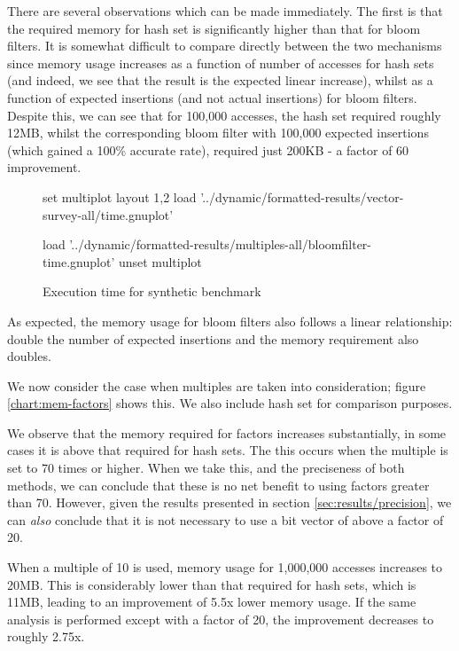 There are several observations which can be made immediately. The first is that the required memory for hash set is significantly higher than that for bloom filters. It is somewhat difficult to compare directly between the two mechanisms since memory usage increases as a function of number of accesses for hash sets (and indeed, we see that the result is the expected linear increase), whilst as a function of expected insertions (and not actual insertions) for bloom filters. Despite this, we can see that for 100,000 accesses, the hash set required roughly 12MB, whilst the corresponding bloom filter with 100,000 expected insertions (which gained a 100\% accurate rate), required just 200KB - a factor of 60 improvement.

\begin{figure}
	\centering
	\begin{gnuplot}[terminal=pdf]
	set multiplot layout 1,2
		load '../dynamic/formatted-results/vector-survey-all/time.gnuplot'
		
		load '../dynamic/formatted-results/multiples-all/bloomfilter-time.gnuplot'
	unset multiplot
	\end{gnuplot}
	\caption{Execution time for synthetic benchmark}
	\label{chart:time-all}
\end{figure}

As expected, the memory usage for bloom filters also follows a linear relationship: double the number of expected insertions and the memory requirement also doubles.

We now consider the case when multiples are taken into consideration; figure \ref{chart:mem-factors} shows this. We also include hash set for comparison purposes.

We observe that the memory required for factors increases substantially, in some cases it is above that required for hash sets. The this occurs when the multiple is set to 70 times or higher. When we take this, and the preciseness of both methods, we can conclude that these is no net benefit to using factors greater than 70. However, given the results presented in section \ref{sec:results/precision}, we can \emph{also} conclude that it is not necessary to use a bit vector of above a factor of 20.

When a multiple of 10 is used, memory usage for 1,000,000 accesses increases to 20MB. This is considerably lower than that required for hash sets, which is 11MB, leading to an improvement of 5.5x lower memory usage. If the same analysis is performed except with a factor of 20, the improvement decreases to roughly 2.75x.

